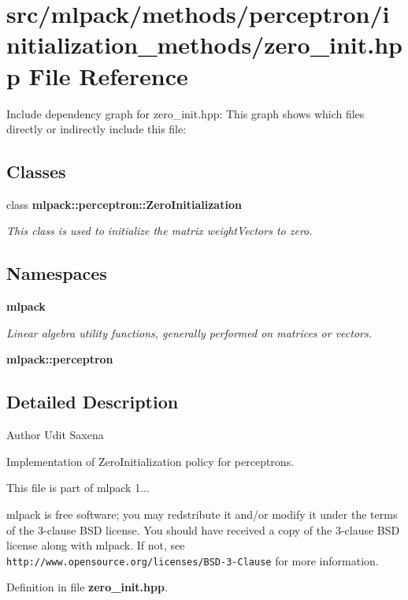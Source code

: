 \section{src/mlpack/methods/perceptron/initialization\-\_\-methods/zero\-\_\-init.hpp File Reference}
\label{zero__init_8hpp}
Include dependency graph for zero\-\_\-init.\-hpp\-:
This graph shows which files directly or indirectly include this file\-:
\subsection*{Classes}
\begin{DoxyCompactItemize}
\item 
class {\bf mlpack\-::perceptron\-::\-Zero\-Initialization}
\begin{DoxyCompactList}\small\item\em This class is used to initialize the matrix weight\-Vectors to zero. \end{DoxyCompactList}\end{DoxyCompactItemize}
\subsection*{Namespaces}
\begin{DoxyCompactItemize}
\item 
{\bf mlpack}
\begin{DoxyCompactList}\small\item\em Linear algebra utility functions, generally performed on matrices or vectors. \end{DoxyCompactList}\item 
{\bf mlpack\-::perceptron}
\end{DoxyCompactItemize}


\subsection{Detailed Description}
\begin{DoxyAuthor}{Author}
Udit Saxena
\end{DoxyAuthor}
Implementation of Zero\-Initialization policy for perceptrons.

This file is part of mlpack 1...

mlpack is free software; you may redstribute it and/or modify it under the terms of the 3-\/clause B\-S\-D license. You should have received a copy of the 3-\/clause B\-S\-D license along with mlpack. If not, see {\tt http\-://www.\-opensource.\-org/licenses/\-B\-S\-D-\/3-\/\-Clause} for more information. 

Definition in file {\bf zero\-\_\-init.\-hpp}.

